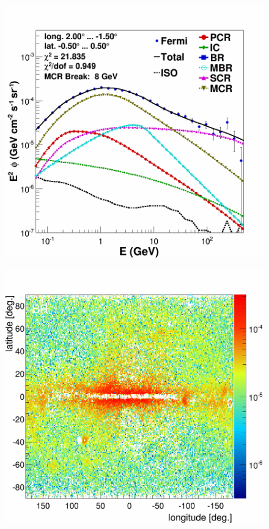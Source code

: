 \newpage
\begin{figure}[H]
  \centering
  \begin{minipage}[h]{0.45\textwidth}
  	\centering
	\includegraphics[width=1.\linewidth]{pic/discussion/MBR_CMZ.png}
  	\subcaption{}
  	\label{}
  \end{minipage}
  \hfill
  \begin{minipage}[h]{0.45\textwidth}
	  \centering
	  \includegraphics[width=1.\linewidth]{pic/discussion/MBR_BR_Integral.png}

\end{minipage}
\end{figure}
